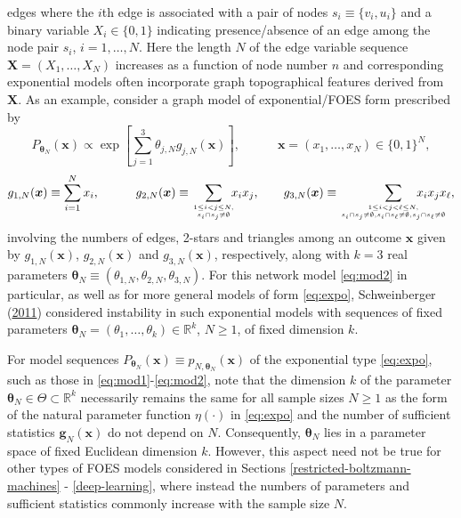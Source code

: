 \documentclass[12pt]{article}
\theoremstyle{definition}
\begin{document}
edges where the \(i\)th edge is associated with a pair of nodes
\(s_i \equiv \{v_i,u_i\}\) and a binary variable \(X_i\in\{0,1\}\)
indicating presence/absence of an edge among the node pair \(s_i\),
\(i=1,\ldots,N\). Here the length \(N\) of the edge variable sequence
\(\boldsymbol X = (X_1,\ldots,X_N)\) increases as a function of node
number \(n\) and corresponding exponential models often incorporate
graph topographical features derived from \(\boldsymbol X\). As an
example, consider a graph model of exponential/FOES form prescribed by
\begin{equation}
\label{eq:mod2}
P_{\boldsymbol \theta_N}(\boldsymbol x) \propto
 \exp\left[\sum_{j=1}^3 \theta_{j,N} g_{j,N}(\boldsymbol x)\right], \quad\qquad \boldsymbol x=(x_1,\ldots,x_N)  \in\{0,1\}^N,
\end{equation}
\[
  g_{1,N}(\boldsymbol x) \equiv \sum_{i=1}^N  x_i, \qquad\quad g_{2,N}(\boldsymbol x) \equiv \sum_{1 \leq i<j \leq N,\atop s_i \cap s_j \neq \emptyset}\!\!\!   x_i x_j, \qquad
  g_{3,N}(\boldsymbol x) \equiv \sum_{1 \leq i<j<\ell \leq N, \atop s_i \cap s_j \neq \emptyset,s_i \cap s_\ell \neq \emptyset, \\ s_j \cap s_\ell \neq \emptyset } \!\!\!\!\!\!\!\!  \!\!\!\!\!\!\!\!   x_i x_j x_\ell,
\] involving the numbers of edges, 2-stars and triangles among an
outcome \(\boldsymbol x\) given by \(g_{1,N}(\boldsymbol x)\),
\(g_{2,N}(\boldsymbol x)\) and \(g_{3,N}(\boldsymbol x)\), respectively,
along with \(k=3\) real parameters
\(\boldsymbol \theta_N \equiv (\theta_{1,N},\theta_{2,N},\theta_{3,N})\).
For this network model \eqref{eq:mod2} in particular, as well as for more
general models of form \eqref{eq:expo}, Schweinberger
(\protect\hyperlink{ref-schweinberger2011instability}{2011}) considered
instability in such exponential models with sequences of fixed
parameters
\(\boldsymbol \theta_N = (\theta_1,\ldots,\theta_k)\in\mathbb{R}^k\),
\(N \geq 1\), of fixed dimension \(k\).

For model sequences
\(P_{\boldsymbol \theta_N}(\boldsymbol x)\equiv p_{N,\boldsymbol \theta_N}(\boldsymbol x)\)
of the exponential type \eqref{eq:expo}, such as those in
\eqref{eq:mod1}-\eqref{eq:mod2}, note that the dimension \(k\) of the
parameter \(\boldsymbol \theta_N\in\Theta \subset \mathbb{R}^k\)
necessarily remains the same for all sample sizes \(N \geq 1\) as the
form of the natural parameter function \(\eta(\cdot)\) in \eqref{eq:expo}
and the number of sufficient statistics
\(\boldsymbol g_{N}(\boldsymbol x)\) do not depend on \(N\).
Consequently, \(\boldsymbol \theta_N\) lies in a parameter space of
fixed Euclidean dimension \(k\). However, this aspect need not be true
for other types of FOES models considered in Sections
\ref{restricted-boltzmann-machines} - \ref{deep-learning}, where instead
the numbers of parameters and sufficient statistics commonly increase
with the sample size \(N\).
\end{document}
